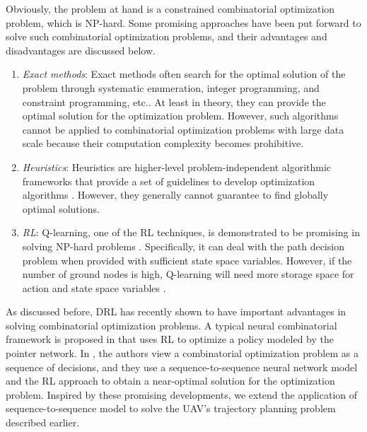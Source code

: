 \documentclass[journal]{IEEEtran}
\begin{document}
	Obviously, the problem at hand is a constrained combinatorial optimization problem, which is NP-hard. Some promising approaches have been put forward to solve such combinatorial optimization problems, and their advantages and disadvantages are discussed below.
	\begin{enumerate}
		\item \emph{Exact methods}:  Exact methods often search for the optimal solution of the problem through systematic enumeration, integer programming, and constraint programming, etc.\cite{J. Puchinger and G. R. Raidl}. At least in theory, they can provide the optimal solution for the optimization problem. However, such algorithms cannot be applied to combinatorial optimization problems with large data scale because their computation complexity becomes prohibitive.
		
		\item \emph{Heuristics}: Heuristics are higher-level problem-independent algorithmic frameworks that provide a set of guidelines to develop optimization algorithms \cite{K. Sorensen}. However, they generally cannot guarantee to find globally optimal solutions.
		
		\item \emph{RL}: Q-learning, one of the RL techniques, is demonstrated to be promising in solving NP-hard problems \cite{X. Liu}. Specifically, it can deal with the path decision problem when provided with sufficient state space variables. However, if the number of ground nodes is high, Q-learning will need more storage space for action and state space variables \cite{B. Zhang}.
		
		
	\end{enumerate}
	
	
	As discussed before, DRL has recently shown to have important advantages in solving combinatorial optimization problems. A typical neural combinatorial framework is proposed in \cite{I. Bello} that uses RL to optimize a policy modeled by the pointer network. In \cite{M. Nazari}, the authors view a combinatorial optimization problem as a sequence of decisions, and they use a sequence-to-sequence neural network model and the RL approach to obtain a near-optimal solution for the optimization problem. Inspired by these promising developments, we extend the application of sequence-to-sequence model to solve the UAV's trajectory planning problem described earlier.
	
\end{document}
